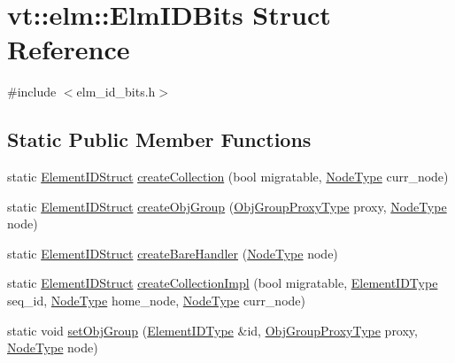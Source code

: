 \hypertarget{structvt_1_1elm_1_1_elm_i_d_bits}{}\section{vt\+:\+:elm\+:\+:Elm\+I\+D\+Bits Struct Reference}
\label{structvt_1_1elm_1_1_elm_i_d_bits}


{\ttfamily \#include $<$elm\+\_\+id\+\_\+bits.\+h$>$}

\subsection*{Static Public Member Functions}
\begin{DoxyCompactItemize}
\item 
static \hyperlink{structvt_1_1elm_1_1_element_i_d_struct}{Element\+I\+D\+Struct} \hyperlink{structvt_1_1elm_1_1_elm_i_d_bits_ad5c19f422d984b6011c59babac99127f}{create\+Collection} (bool migratable, \hyperlink{namespacevt_a866da9d0efc19c0a1ce79e9e492f47e2}{Node\+Type} curr\+\_\+node)
\item 
static \hyperlink{structvt_1_1elm_1_1_element_i_d_struct}{Element\+I\+D\+Struct} \hyperlink{structvt_1_1elm_1_1_elm_i_d_bits_a3749809539048f9a46f5d7b2ef3b7163}{create\+Obj\+Group} (\hyperlink{namespacevt_ad7cae989df485fccca57f0792a880a8e}{Obj\+Group\+Proxy\+Type} proxy, \hyperlink{namespacevt_a866da9d0efc19c0a1ce79e9e492f47e2}{Node\+Type} node)
\item 
static \hyperlink{structvt_1_1elm_1_1_element_i_d_struct}{Element\+I\+D\+Struct} \hyperlink{structvt_1_1elm_1_1_elm_i_d_bits_a7c43226050fef30c9aac216ba33051b5}{create\+Bare\+Handler} (\hyperlink{namespacevt_a866da9d0efc19c0a1ce79e9e492f47e2}{Node\+Type} node)
\item 
static \hyperlink{structvt_1_1elm_1_1_element_i_d_struct}{Element\+I\+D\+Struct} \hyperlink{structvt_1_1elm_1_1_elm_i_d_bits_a2a29871056e99e94dfe7e411357d1f86}{create\+Collection\+Impl} (bool migratable, \hyperlink{namespacevt_1_1elm_a63afb64985b41b7b6dcf2f01336391f8}{Element\+I\+D\+Type} seq\+\_\+id, \hyperlink{namespacevt_a866da9d0efc19c0a1ce79e9e492f47e2}{Node\+Type} home\+\_\+node, \hyperlink{namespacevt_a866da9d0efc19c0a1ce79e9e492f47e2}{Node\+Type} curr\+\_\+node)
\item 
static void \hyperlink{structvt_1_1elm_1_1_elm_i_d_bits_a0d8c4b097e14d441eb4c000a45eb83b3}{set\+Obj\+Group} (\hyperlink{namespacevt_1_1elm_a63afb64985b41b7b6dcf2f01336391f8}{Element\+I\+D\+Type} \&id, \hyperlink{namespacevt_ad7cae989df485fccca57f0792a880a8e}{Obj\+Group\+Proxy\+Type} proxy, \hyperlink{namespacevt_a866da9d0efc19c0a1ce79e9e492f47e2}{Node\+Type} node)

\end{DoxyCompactItemize}
